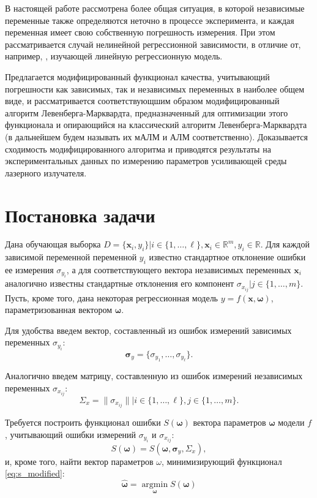 \documentclass[11pt,a4paper]{article}
\newcommand{\bomega}{\boldsymbol{\omega}}
\begin{document}
В настоящей работе рассмотрена более общая ситуация, в которой независимые
переменные также определяются неточно в процессе эксперимента, и каждая переменная
имеет свою собственную погрешность измерения. При этом рассматривается случай
нелинейной регрессионной зависимости, в отличие от, например,
\cite{kiryati2000heteroscedastic}, изучающей линейную регрессионную модель.

Предлагается модифицированный
функционал качества, учитывающий погрешности как зависимых, так и независимых
переменных в наиболее общем виде, и рассматривается соответствующшим образом
модифицированный алгоритм Левенберга-Марквардта, предназначенный для оптимизации
этого функционала и опирающийся на классический алгоритм Левенберга-Марквардта
(в дальнейшем будем называть их мАЛМ и АЛМ соответственно).
Доказывается сходимость модифицированного алгоритма и приводятся
результаты на экспериментальных данных по измерению параметров усиливающей
среды лазерного излучателя.

\section{Постановка задачи}

Дана обучающая выборка $D = \{ \mathbf{x}_i, y_i \} | i \in \{ 1, \dots, \ell \}, \mathbf{x}_i \in \mathbb{R}^m, y_i \in \mathbb{R}$.
Для каждой зависимой переменной переменной $y_i$ известно
стандартное отклонение ошибки ее измерения $\sigma_{y_i}$, а для соответствующего
вектора независимых переменных $\mathbf{x}_i$ аналогично известны стандартные
отклонения его компонент $\sigma_{x_{ij}} | j \in \{ 1, \dots, m \}$.
Пусть, кроме того, дана некоторая регрессионная модель
$y = f (\mathbf{x}, \bomega)$, параметризованная вектором $\bomega$.

Для удобства введем вектор, составленный из ошибок измерений зависимых переменных
$\sigma_{y_i}$:
\[
  \boldsymbol{\sigma}_y = \{ \sigma_{y_1}, \dots, \sigma_{y_{\ell}} \}.
\]

Аналогично введем матрицу, составленную из ошибок измерений независимых переменных
$\sigma_{x_{ij}}$:
\[
  \Sigma_x = \| \sigma_{x_{ij}} \| | i \in \{ 1, \dots, \ell \}, j \in \{ 1, \dots, m \}.
\]

Требуется построить функционал ошибки $S(\bomega)$ вектора параметров
$\bomega$ модели $f$, учитывающий ошибки измерений $\sigma_{y_i}$ и
$\sigma_{x_{ij}}$:
\begin{equation}
  S(\bomega) = S(\bomega, \boldsymbol{\sigma}_y, \Sigma_x),
  \label{eq:s_modified}
\end{equation}
и, кроме того, найти вектор параметров $\omega$, минимизирующий функционал
\eqref{eq:s_modified}:
\begin{equation}
  \hat{\bomega} = \mathop{\arg \min}\limits_{\bomega} S(\bomega)
\end{equation}
\end{document}
